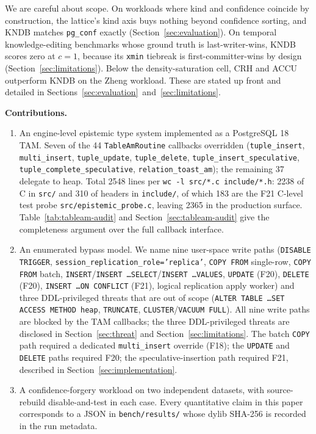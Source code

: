 \documentclass[sigconf, nonacm]{acmart}
\begin{document}
We are careful about scope. On workloads where kind and confidence coincide by construction, the lattice's kind axis buys nothing beyond confidence sorting, and KNDB matches \texttt{pg\_conf} exactly (Section~\ref{sec:evaluation}). On temporal knowledge-editing benchmarks whose ground truth is last-writer-wins, KNDB scores zero at $c=1$, because its \texttt{xmin} tiebreak is first-committer-wins by design (Section~\ref{sec:limitations}). Below the density-saturation cell, CRH and ACCU outperform KNDB on the Zheng workload. These are stated up front and detailed in Sections~\ref{sec:evaluation}~and~\ref{sec:limitations}.

\textbf{Contributions.}
\begin{enumerate}
\item An engine-level epistemic type system implemented as a PostgreSQL 18 TAM. Seven of the 44 \texttt{TableAmRoutine} callbacks overridden (\texttt{tuple\_insert}, \texttt{multi\_insert}, \texttt{tuple\_update}, \texttt{tuple\_delete}, \texttt{tuple\_insert\_speculative}, \texttt{tuple\_complete\_speculative}, \texttt{relation\_toast\_am}); the remaining 37 delegate to heap. Total 2548 lines per \texttt{wc -l src/*.c include/*.h}: 2238 of C in \texttt{src/} and 310 of headers in \texttt{include/}, of which 183 are the F21 C-level test probe \texttt{src/epistemic\_probe.c}, leaving 2365 in the production surface. Table~\ref{tab:tableam-audit} and Section~\ref{sec:tableam-audit} give the completeness argument over the full callback interface.
\item An enumerated bypass model. We name nine user-space write paths (\texttt{DISABLE TRIGGER}, \texttt{session\_replication\_role='replica'}, \texttt{COPY FROM} single-row, \texttt{COPY FROM} batch, \texttt{INSERT}/\texttt{INSERT \dots SELECT}/\texttt{INSERT \dots VALUES}, \texttt{UPDATE} (F20), \texttt{DELETE} (F20), \texttt{INSERT \dots ON CONFLICT} (F21), logical replication apply worker) and three DDL-privileged threats that are out of scope (\texttt{ALTER TABLE \dots SET ACCESS METHOD heap}, \texttt{TRUNCATE}, \texttt{CLUSTER}/\texttt{VACUUM FULL}). All nine write paths are blocked by the TAM callbacks; the three DDL-privileged threats are disclosed in Section~\ref{sec:threat} and Section~\ref{sec:limitations}. The batch \texttt{COPY} path required a dedicated \texttt{multi\_insert} override (F18); the \texttt{UPDATE} and \texttt{DELETE} paths required F20; the speculative-insertion path required F21, described in Section~\ref{sec:implementation}.
\item A confidence-forgery workload on two independent datasets, with source-rebuild disable-and-test in each case. Every quantitative claim in this paper corresponds to a JSON in \texttt{bench/results/} whose dylib SHA-256 is recorded in the run metadata.

\end{enumerate}
\end{document}
